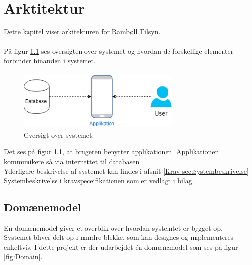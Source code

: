 \chapter{Arktitektur}
Dette kapitel viser arkitekturen for Rambøll Tilsyn. \\ \\
På figur \ref{fig:OversigtSystembeskrivelse} ses oversigten over systemet og hvordan de forskellige elementer forbinder hinanden i systemet.
\begin{figure}[H] %
	\centering
	\includegraphics[height=3cm, width=8cm]{../ArkitekturDesign/OverordnetArkitektur//Oversigtoversystem}
	\caption{Oversigt over systemet.}
	\label{fig:OversigtSystembeskrivelse}
\end{figure}
Det ses på figur \ref{fig:OversigtSystembeskrivelse}, at brugeren benytter applikationen. Applikationen kommunikere så via internettet til databasen. \\
Yderligere beskrivelse af systemet kan findes i afsnit \ref{Krav-sec:Systembeskrivelse} Systembeskrivelse i kravspeceifikationen som er vedlagt i bilag.

\clearpage

\section{Domænemodel}
En domænemodel giver et overblik over hvordan systemtet er bygget op. Systemet bliver delt op i mindre blokke, som kan designes og implementeres enkeltvis.
I dette projekt er der udarbejdet én domænemodel som ses på figur \ref{fig:Domain}.

